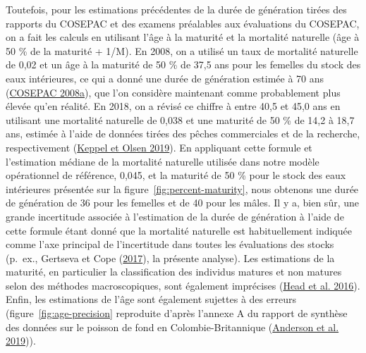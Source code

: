 \documentclass[french,11pt]{book}
\begin{document}
Toutefois, pour les estimations précédentes de la durée de génération tirées des rapports du COSEPAC et des examens préalables aux évaluations du COSEPAC, on a fait les calculs en utilisant l'âge à la maturité et la mortalité naturelle (âge à 50 \% de la maturité + 1/M). En 2008, on a utilisé un taux de mortalité naturelle de 0,02 et un âge à la maturité de 50 \% de 37,5 ans pour les femelles du stock des eaux intérieures, ce qui a donné une durée de génération estimée à 70 ans (\protect\hyperlink{ref-cosewic2008}{COSEPAC 2008a}), que l'on considère maintenant comme probablement plus élevée qu'en réalité. En 2018, on a révisé ce chiffre à entre 40,5 et 45,0 ans en utilisant une mortalité naturelle de 0,038 et une maturité de 50 \% de 14,2 à 18,7 ans, estimée à l'aide de données tirées des pêches commerciales et de la recherche, respectivement (\protect\hyperlink{ref-keppel2019}{Keppel et Olsen 2019}). En appliquant cette formule et l'estimation médiane de la mortalité naturelle utilisée dans notre modèle opérationnel de référence, 0,045, et la maturité de 50 \% pour le stock des eaux intérieures présentée sur la figure~\ref{fig:percent-maturity}, nous obtenons une durée de génération de 36 pour les femelles et de 40 pour les mâles. Il y a, bien sûr, une grande incertitude associée à l'estimation de la durée de génération à l'aide de cette formule étant donné que la mortalité naturelle est habituellement indiquée comme l'axe principal de l'incertitude dans toutes les évaluations des stocks (p.~ex., Gertseva et Cope (\protect\hyperlink{ref-gertseva2017}{2017}), la présente analyse). Les estimations de la maturité, en particulier la classification des individus matures et non matures selon des méthodes macroscopiques, sont également imprécises (\protect\hyperlink{ref-head2016}{Head et al. 2016}). Enfin, les estimations de l'âge sont également sujettes à des erreurs (figure~\ref{fig:age-precision} reproduite d'après l'annexe A du rapport de synthèse des données sur le poisson de fond en Colombie-Britannique (\protect\hyperlink{ref-anderson2019synopsis}{Anderson et al. 2019})).

\clearpage
\end{document}
